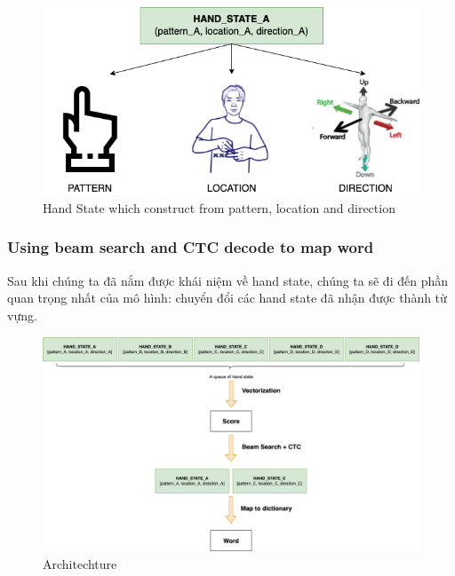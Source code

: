       \begin{figure}[H]
        \centering
        \includegraphics[width=\textwidth]{img/Chap4/HandState.png}
        \caption{ Hand State which construct from pattern, location and direction}
        \label{fig:Chap4-HandState}
      \end{figure}
      

    \subsubsection{ Using beam search and CTC decode to map word }
      Sau khi chúng ta đã nắm được khái niệm về hand state, chúng ta sẽ đi đến phần quan trọng
      nhất của mô hình: chuyển đổi các hand state đã nhận được thành từ vựng.
      

      \begin{figure}[H]
        \centering
        \includegraphics[width=\textwidth]{img/Chap4/Architechture.png}
        \caption{Architechture}
        \label{fig:Chap4-Architechture}
      \end{figure}


